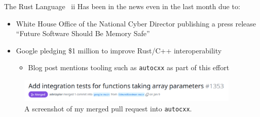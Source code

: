 \documentclass[10pt,aspectratio=169]{beamer}
\begin{document}
\begin{frame}{The Rust Language \ ii}
    Has been in the news even in the last month due to:
    \begin{itemize}
        \item White House Office of the National Cyber Director publishing a press release ``Future Software Should Be Memory Safe'' \cite{PressReleaseFuture2024}  %
        \item Google pledging \$1 million to improve Rust/C++ interoperability \cite{ImprovingInteroperabilityRust}  %
        \begin{itemize}
            \item<2-> \alert{Blog post mentions tooling such as \texttt{autocxx} as part of this effort}
        \end{itemize}
    \end{itemize}

    \vspace{0.5cm}
    \begin{figure}[H]
        \includegraphics[width=0.95\textwidth]{images/autocxx_pr.png}
        \caption{A screenshot of my merged pull request into \texttt{autocxx}.}
        \label{fig:warwick_mantevo_link}
    \end{figure}
\end{frame}
\end{document}

